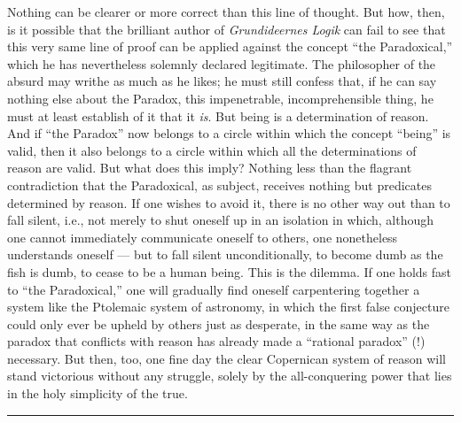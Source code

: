 \documentclass[12pt,a4paper,openany]{book}
\newcommand{\piecerule}{\par\begin{center}\rule{1.5cm}{0.4pt}\end{center}\par}
\newcommand{\opage}[1]{\marginnote{\footnotesize\textit{[#1]}}}
\begin{document}
Nothing can be clearer or more correct than this line of thought. But
how, then, is it possible that the brilliant author of \emph{Grundideernes
Logik} can fail to see that this very same line of proof can be
applied against the concept ``the Paradoxical,'' which he has
nevertheless solemnly declared legitimate. The philosopher of the
absurd may writhe as much as he likes; he must still confess that, if
he can say nothing else about the Paradox, this impenetrable,
incomprehensible thing, he must at least establish of it that it
\emph{is}. But being is a determination of reason. And if ``the
Paradox'' now belongs to a circle within which the concept ``being''
is valid, then it also belongs to a circle within which all the
determinations of reason are valid. But what does this imply? Nothing
less than the flagrant contradiction that the Paradoxical, as subject,
receives nothing but predicates determined by reason. If one wishes to
avoid it, there is no other way out than to fall silent, i.e., not
merely to shut oneself up in an isolation in which, although one
cannot immediately
\opage{42}communicate oneself to others, one nonetheless understands
oneself --- but to fall silent unconditionally, to become dumb as the
fish is dumb, to cease to be a human being. This is the dilemma. If
one holds fast to ``the Paradoxical,'' one will gradually find oneself
carpentering together a system like the Ptolemaic system of astronomy,
in which the first false conjecture could only ever be upheld by
others just as desperate, in the same way as the paradox that
conflicts with reason has already made a ``rational paradox'' (!)
necessary. But then, too, one fine day the clear Copernican system of
reason will stand victorious without any struggle, solely by the
all-conquering power that lies in the holy simplicity of the true.
\piecerule
\end{document}
